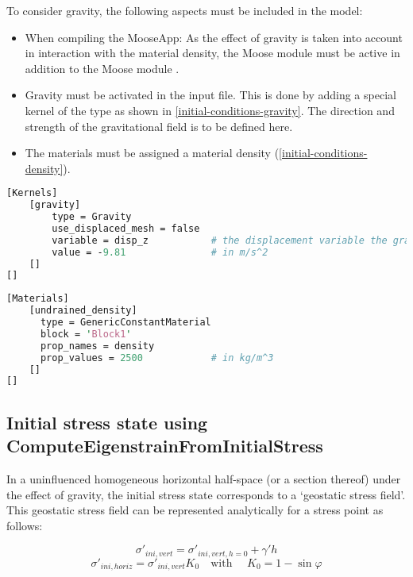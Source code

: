 To consider gravity, the following aspects must be included in the model:
\begin{itemize}
  \item When compiling the MooseApp: As the effect of gravity is taken into account in
        interaction with the material density, the Moose module  must be
        active in addition to the Moose module .
  \item Gravity must be activated in the input file. This is done by adding a special
        kernel of the type  as shown in
        \autoref{initial-conditions-gravity}. The direction and strength of the
        gravitational field is to be defined here.
  \item The materials must be assigned a material density
        (\autoref{initial-conditions-density}).
\end{itemize}

\begin{lstlisting}[language=perl, float, caption={Gravity kernel in a Moose inut file},label={initial-conditions-gravity}]
[Kernels]
    [gravity]
        type = Gravity
        use_displaced_mesh = false
        variable = disp_z           # the displacement variable the gravity is associated with
        value = -9.81               # in m/s^2
    []
[]
\end{lstlisting}

\begin{lstlisting}[language=perl, float, caption={Assignment of a density to subdomain ‘block1’},label={initial-conditions-density}]
[Materials]
    [undrained_density]
      type = GenericConstantMaterial
      block = 'Block1'
      prop_names = density
      prop_values = 2500            # in kg/m^3
    []
[]
\end{lstlisting}

{\hfuzz=20pt
\subsection{Initial stress state using ComputeEigenstrainFromInitialStress}
}
\label{chap:IC-stress-state-simple}

In a uninfluenced homogeneous horizontal half-space (or a section thereof)
under the effect of gravity, the initial stress state corresponds to a
‘geostatic stress field’. This geostatic stress field can be represented
analytically for a stress point as follows:

\begin{equation}
  \sigma'_{ini,vert}=\sigma'_{ini,vert,h=0}+\gamma' h
\end{equation}
\begin{equation}
  \sigma'_{ini,horiz}=\sigma'_{ini,vert} K_0 \quad \text{with } \quad K_0 = 1-\sin\varphi
\end{equation}

